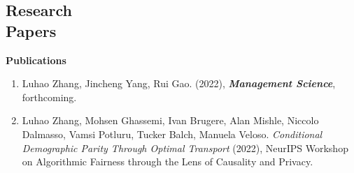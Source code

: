 \documentclass[margin,line]{res}
\newcommand{\MYhref}[3][airforceblue]{\href{#2}{\color{#1}{#3}}}%
\newcommand{\vvspace}{\vspace{0.1in}}
\begin{document}
\begin{resume}
\section{\sc Research \\
Papers}
{\bf Publications}
\begin{enumerate}[leftmargin=0.15in]
    \item Luhao Zhang, Jincheng Yang, Rui Gao. \textit{\MYhref{http://www.optimization-online.org/DB_HTML/2021/12/8749.html}{Optimal Robust Policy for Feature-Based Newsvendor}} (2022), \textit{\textbf{Management Science}}, forthcoming.
    \item Luhao Zhang, Mohsen Ghassemi, Ivan Brugere, Alan Mishle, Niccolo Dalmasso, Vamsi Potluru, Tucker Balch, Manuela Veloso. \textit{Conditional Demographic Parity Through Optimal Transport} (2022), NeurIPS Workshop on Algorithmic Fairness through the Lens of Causality and Privacy.
\end{enumerate}






\end{resume}
\end{document}
